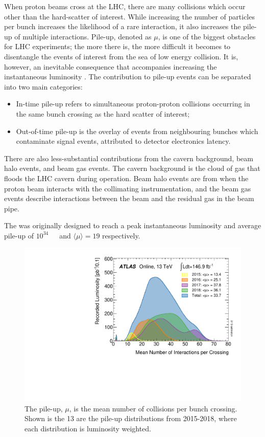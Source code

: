 When proton beams cross at the LHC, there are many collisions which occur other than the hard-scatter of interest. While increasing the number of particles per bunch increases the likelihood of a rare interaction, it also increases the pile-up of multiple interactions. Pile-up, denoted as $\mu$, is one of the biggest obstacles for LHC experiments; the more there is, the more difficult it becomes to disentangle the events of interest from the sea of low energy collision. It is, however, an inevitable consequence that accompanies increasing the instantaneous luminosity . The contribution to pile-up events can be separated into two main categories: 
\begin{itemize}
  \item In-time pile-up refers to simultaneous proton-proton collisions occurring in the same bunch crossing as the hard scatter of interest;
  \item Out-of-time pile-up is the overlay of events from neighbouring bunches which contaminate signal events, attributed to detector electronics latency.
\end{itemize}
There are also less-substantial contributions from the cavern background, beam halo events, and beam gas events. The cavern background is the cloud of gas that floods the LHC cavern during operation. Beam halo events are from when the proton beam interacts with the collimating instrumentation, and the beam gas events describe interactions between the beam and the residual gas in the beam pipe. 

The \LHC was originally designed to reach a peak instantaneous luminosity and average pile-up of \unit{$10^{34}$}{\rpsquare{\cm}\reciprocal{\second}} and $\langle\mu\rangle=19$ respectively. 

\begin{figure}
  \includegraphics[width=\smallfigwidth]{Figures/LHC/PileUp_2015_2018.pdf}
  \caption[Pile-up distributions.]
  {The pile-up, $\mu$, is the mean number of collisions per bunch crossing. Shown is the \unit{13}{\TeV} are the pile-up distributions from 2015-2018, where each distribution is luminosity weighted.}
  \label{fig:Pileup}
\end{figure}

